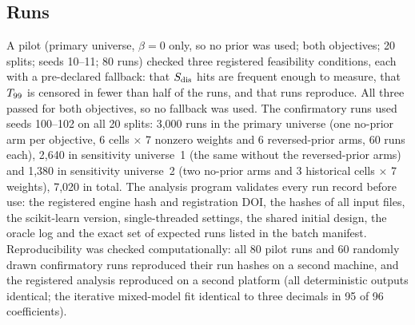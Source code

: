 \subsection{Runs}\label{sec:runs}
A pilot (primary universe, $\beta=0$ only, so no prior was used; both objectives; 20 splits; seeds 10--11; 80 runs) checked three
registered feasibility conditions, each with a pre-declared fallback: that $S_{\mathrm{dis}}$ hits are frequent enough to measure, that
$T_{99}$ is censored in fewer than half of the runs, and that runs reproduce. All three passed for both objectives, so no fallback
was used. The confirmatory runs used seeds 100--102 on all 20 splits: 3,000 runs in the primary universe (one no-prior arm per objective, 6 cells $\times$ 7 nonzero weights and 6 reversed-prior arms,
60 runs each), 2,640 in sensitivity universe~1 (the same without the reversed-prior arms) and 1,380 in sensitivity universe~2 (two
no-prior arms and 3 historical cells $\times$ 7 weights), 7,020 in total. The analysis program validates every run record before use: the registered engine hash and
registration DOI, the hashes of all input files, the scikit-learn version, single-threaded settings, the shared initial design,
the oracle log and the exact set of expected runs listed in the batch manifest.
Reproducibility was checked computationally: all 80 pilot runs and 60 randomly drawn confirmatory runs reproduced their run hashes
on a second machine, and the registered analysis reproduced on a second platform (all deterministic outputs identical; the
iterative mixed-model fit identical to three decimals in 95 of 96 coefficients).

